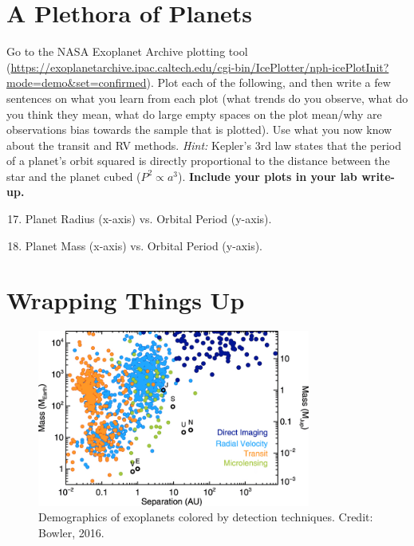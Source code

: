 \documentclass[11pt]{article}
\begin{document}

\section{A Plethora of Planets}
Go to the NASA Exoplanet Archive plotting tool (\url{https://exoplanetarchive.ipac.caltech.edu/cgi-bin/IcePlotter/nph-icePlotInit?mode=demo&set=confirmed}).  Plot each of the following, and then write a few sentences on what you learn from each plot (what trends do you observe, what do you think they mean, what do large empty spaces on the plot mean/why are observations bias towards the sample that is plotted).  Use what you now know about the transit and RV methods. \textit{Hint:} Kepler's 3rd law states that the period of a planet's orbit squared is directly proportional to the distance between the star and the planet cubed ($P^2 \propto a^3$). \textbf{Include your plots in your lab write-up.} 
    \begin{enumerate}
    \setcounter{enumi}{16}
        \item Planet Radius (x-axis) vs. Orbital Period (y-axis). %
        \item Planet Mass (x-axis) vs. Orbital Period (y-axis). %
    \end{enumerate}


\section{Wrapping Things Up}

\begin{figure}[h!]
    \centering
    \includegraphics[width=0.8\textwidth]{Images/Exoplanet Demographic Techniques.png}
    \caption{Demographics of exoplanets colored by detection techniques. Credit: Bowler, 2016.}
    \label{fig:techniques}
\end{figure}
\end{document}
